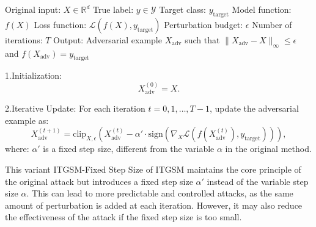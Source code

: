 Original input: $X \in \mathbb{R}^d$
True label: $y \in \mathcal{Y}$
Target class: $y_{\text{target}}$
Model function: $f(X)$
Loss function: $\mathcal{L}(f(X), y_{\text{target}})$
Perturbation budget: $\epsilon$
Number of iterations: $T$
Output: Adversarial example $X_{\text{adv}}$ such that $\|X_{\text{adv}} - X\|_\infty \leq \epsilon$ and $f(X_{\text{adv}}) = y_{\text{target}}$

1.Initialization:
   \[
   X^{(0)}_{\text{adv}} = X.
   \]

2.Iterative Update:
   For each iteration $t = 0, 1, \dots, T-1$, update the adversarial example as:
   \[
   X^{(t+1)}_{\text{adv}} = \text{clip}_{X, \epsilon} \left( X^{(t)}_{\text{adv}} - \alpha' \cdot \text{sign} \left( \nabla_X \mathcal{L}(f(X^{(t)}_{\text{adv}}), y_{\text{target}}) \right) \right),
   \]
where:
$\alpha'$ is a fixed step size, different from the variable $\alpha$ in the original method.

This variant ITGSM-Fixed Step Size of ITGSM maintains the core principle of the original attack but introduces a fixed step size $\alpha'$ instead of the variable step size $\alpha$. This can lead to more predictable and controlled attacks, as the same amount of perturbation is added at each iteration. However, it may also reduce the effectiveness of the attack if the fixed step size is too small.